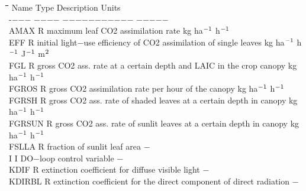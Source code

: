 \documentclass[11pt]{article}
\begin{document}
\begin{tabbing}
\hspace{1.27cm}\=\hspace{1.27cm}\=\hspace{1.27cm}\=\hspace{1.27cm}\=%
\hspace{1.27cm}\=\hspace{1.27cm}\=\hspace{1.27cm}\=\hspace{1.27cm}\=%
\hspace{1.27cm}\=\hspace{1.27cm}\=\kill
Name \> \> Type \> Description                                       \> \> \> \> \> \> \> Units\\
-$-$$-$$-$ \> \> $-$$-$$-$$-$\> $-$$-$$-$$-$$-$$-$$-$$-$$-$$-$$-$                                        \> \> \> \> \> \> \> $-$$-$$-$$-$$-$ \\
AMAX\> \> R   \> maximum leaf CO2  assimilation rate       \> \> \> \> \> \> \> kg ha$^{{\rm -1}}$ h$^{{\rm -1}}$ \\
EFF \> \> R   \> initial light$-$use efficiency of CO2 assimilation of single leaves  \> \> \> \> \> \> \> kg ha$^{{\rm -1}}$ h$^{{\rm -1}}$  J$^{{\rm -1}}$ m$^{{\rm 2}}$\\
FGL \> \> R   \> gross CO2 ass. rate at a certain depth and LAIC in the crop canopy\> \> \> \> \> \> \> kg ha$^{{\rm -1}}$ h$^{{\rm -1}}$ \\
FGROS\> \> R   \> gross CO2 assimilation rate per hour of the canopy \> \> \> \> \> \> \> kg ha$^{{\rm -1}}$ h$^{{\rm -1}}$ \\
FGRSH\> \> R   \> gross CO2 ass. rate of shaded leaves at a certain depth in canopy \> \> \> \> \> \> \> kg ha$^{{\rm -1}}$ h$^{{\rm -1}}$ \\
FGRSUN\> \> R   \> gross CO2 ass. rate of sunlit leaves at a certain depth in canopy  \> \> \> \> \> \> \> kg ha$^{{\rm -1}}$ h$^{{\rm -1}}$ \\
FSLLA   \> \> R   \> fraction of sunlit leaf area                 \> \> \> \> \> \> \> $-$\\
I       \> \> I   \> DO$-$loop control variable                    \> \> \> \> \> \> \> $-$\\
KDIF    \> \> R   \> extinction coefficient for diffuse visible light\> \> \> \> \> \> \> $-$\\
KDIRBL  \> \> R   \> extinction coefficient for the direct component of direct radiation\> \> \> \> \> \> \> $-$\\
$$
\end{tabbing}
\end{document}
